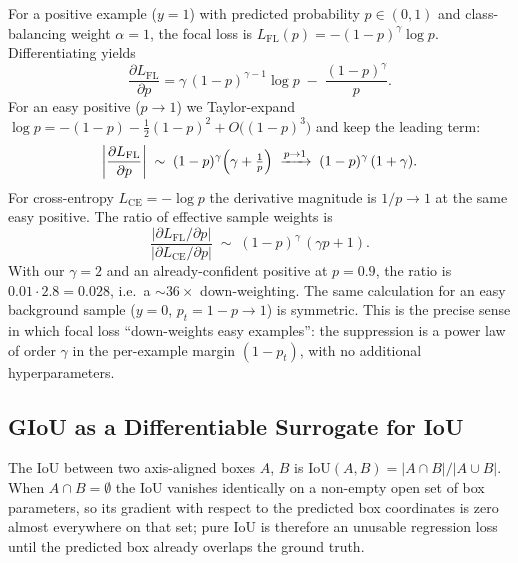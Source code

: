 \documentclass[11pt,a4paper]{article}
\begin{document}
For a positive example ($y = 1$) with predicted probability $p \in (0, 1)$ and class-balancing weight $\alpha = 1$, the focal loss is $L_{\mathrm{FL}}(p) = -(1-p)^\gamma \log p$. Differentiating yields
\begin{equation}
\frac{\partial L_{\mathrm{FL}}}{\partial p} = \gamma\,(1 - p)^{\gamma - 1}\log p \;-\; \frac{(1 - p)^{\gamma}}{p}.
\end{equation}
For an easy positive ($p \to 1$) we Taylor-expand $\log p = -(1 - p) - \tfrac{1}{2}(1 - p)^2 + O\bigl((1 - p)^3\bigr)$ and keep the leading term:
\begin{equation}
\left|\frac{\partial L_{\mathrm{FL}}}{\partial p}\right| \;\sim\; (1 - p)^{\gamma}\Bigl(\gamma + \tfrac{1}{p}\Bigr) \;\xrightarrow{p \to 1}\; (1 - p)^{\gamma}\,(1 + \gamma).
\end{equation}
For cross-entropy $L_{\mathrm{CE}} = -\log p$ the derivative magnitude is $1/p \to 1$ at the same easy positive. The ratio of effective sample weights is
\begin{equation}
\frac{|\partial L_{\mathrm{FL}} / \partial p|}{|\partial L_{\mathrm{CE}} / \partial p|} \;\sim\; (1 - p)^{\gamma}\,(\gamma p + 1).
\end{equation}
With our $\gamma = 2$ and an already-confident positive at $p = 0.9$, the ratio is $0.01 \cdot 2.8 = 0.028$, i.e.\ a $\sim\!36\times$ down-weighting. The same calculation for an easy background sample ($y = 0$, $p_t = 1 - p \to 1$) is symmetric. This is the precise sense in which focal loss ``down-weights easy examples'': the suppression is a power law of order $\gamma$ in the per-example margin $(1 - p_t)$, with no additional hyperparameters.

\subsection{GIoU as a Differentiable Surrogate for IoU}
\label{sec:numerical-giou}

The IoU between two axis-aligned boxes $A$, $B$ is $\mathrm{IoU}(A, B) = |A \cap B| / |A \cup B|$. When $A \cap B = \emptyset$ the IoU vanishes identically on a non-empty open set of box parameters, so its gradient with respect to the predicted box coordinates is zero almost everywhere on that set; pure IoU is therefore an unusable regression loss until the predicted box already overlaps the ground truth.
\end{document}
